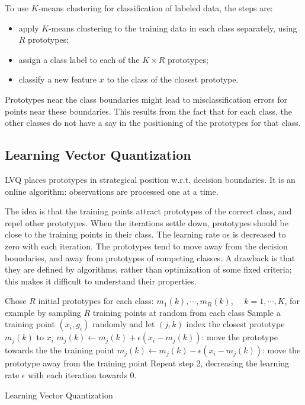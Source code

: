 \documentclass[12pt, letterpaper]{article}
\theoremstyle{definition}
\begin{document}
To use $K$-means clustering for classification of labeled data, the steps are:
\begin{itemize}
\item apply $K$-means clustering to the training data in each class separately, using $R$ prototypes;
\item assign a class label to each of the $K \times R$ prototypes;
\item classify a new feature $x$ to the class of the closest prototype.
\end{itemize}
Prototypes near the class boundaries might lead to misclassification errors for points near these boundaries. This results from the fact that for each class, the other classes do not have a say in the positioning of the prototypes for that class.

\subsection{Learning Vector Quantization}
LVQ places prototypes in strategical position w.r.t. decision boundaries. It is an online algorithm: observations are processed one at a time.

The idea is that the training points attract prototypes of the correct class, and repel other prototypes. When the iterations settle down, prototypes should be close to the training points in their class. The learning rate o$\epsilon$ is decreased to zero with each iteration. The prototypes tend to move away from the decision boundaries, and away from prototypes of competing classes.
A drawback is that they are defined by algorithms, rather than optimization of some fixed
criteria; this makes it difficult to understand their properties.
\begin{algorithm}[H]
\SetAlgoLined
Chose $R$ initial prototypes for each class: $m_1(k),\cdots, m_R(k)$, $\quad k=1,\cdots, K$, for example by sampling $R$ training points at random from each class\;
Sample a training point $(x_i, g_i)$ randomly and let $(j,k)$ index the closest prototype $m_j(k)$ to $x_i$\;
{
	$m_j (k) \leftarrow m_j(k) + \epsilon(x_i-m_j(k))$: move the prototype towards the the training point\;
}
{
	$m_j (k) \leftarrow m_j(k) - \epsilon(x_i-m_j(k))$: move the prototype away from the training point\;
}
Repeat step 2, decreasing the learning rate $\epsilon$ with each iteration towards $0$.
\caption{Learning Vector Quantization}
\end{algorithm}
\end{document}
